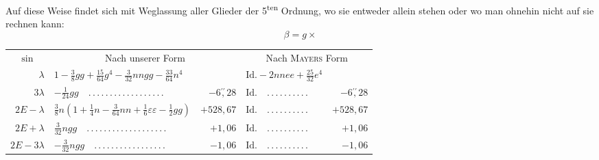 \par\noindent\hspace*{\parindent}Auf diese Weise findet sich mit Weglassung aller Glieder der 5\textsuperscript{ten}
Ordnung, wo sie entweder allein stehen oder wo man ohnehin nicht auf sie
rechnen kann:
\[
\beta=g\times
\]
\begin{landscape}
\begingroup\small
\setlength{\LTpre}{0pt}\setlength{\LTpost}{0pt}
\setlength{\tabcolsep}{3pt}
\renewcommand{\arraystretch}{1.10}
\begin{longtable}{r|p{7.8cm}r@{\quad}p{4.3cm}r}
\multicolumn{1}{c}{\(\sin\)}&\multicolumn{2}{c}{Nach unserer Form}&
\multicolumn{2}{c}{Nach \textsc{Mayers} Form}\\
\(\lambda\)&\(1-\tfrac38gg+\tfrac{15}{64}g^4-\tfrac{3}{32}nngg-\tfrac{33}{64}n^4\)&
&\(\text{Id.}-2nnee+\tfrac{25}{32}e^4\)&\\
\(3\lambda\)&\(-\tfrac{1}{24}gg\quad \mathord{.}\,\mathord{.}\,\mathord{.}\,\mathord{.}\,\mathord{.}\,\mathord{.}\,\mathord{.}\,\mathord{.}\,\mathord{.}\,\mathord{.}\,\mathord{.}\,\mathord{.}\,\mathord{.}\,\mathord{.}\,\mathord{.}\,\mathord{.}\,\mathord{.}\,\mathord{.}\)&\(-6\overset{\prime\prime}{,}28\)
&\(\text{Id.}\quad \mathord{.}\,\mathord{.}\,\mathord{.}\,\mathord{.}\,\mathord{.}\,\mathord{.}\,\mathord{.}\,\mathord{.}\,\mathord{.}\,\mathord{.}\)&\(-6\overset{\prime\prime}{,}28\)\\
\(2E-\lambda\)&\(\tfrac38n(1+\tfrac14n-\tfrac{3}{64}nn+\tfrac16\varepsilon\varepsilon-\tfrac12gg)\)&\(+528{,}67\)
&\(\text{Id.}\quad \mathord{.}\,\mathord{.}\,\mathord{.}\,\mathord{.}\,\mathord{.}\,\mathord{.}\,\mathord{.}\,\mathord{.}\,\mathord{.}\,\mathord{.}\)&\(+528{,}67\)\\
\(2E+\lambda\)&\(\tfrac{3}{32}ngg\quad \mathord{.}\,\mathord{.}\,\mathord{.}\,\mathord{.}\,\mathord{.}\,\mathord{.}\,\mathord{.}\,\mathord{.}\,\mathord{.}\,\mathord{.}\,\mathord{.}\,\mathord{.}\,\mathord{.}\,\mathord{.}\,\mathord{.}\,\mathord{.}\,\mathord{.}\,\mathord{.}\,\mathord{.}\)&\(+1{,}06\)
&\(\text{Id.}\quad \mathord{.}\,\mathord{.}\,\mathord{.}\,\mathord{.}\,\mathord{.}\,\mathord{.}\,\mathord{.}\,\mathord{.}\,\mathord{.}\,\mathord{.}\)&\(+1{,}06\)\\
\(2E-3\lambda\)&\(-\tfrac{3}{32}ngg\quad \mathord{.}\,\mathord{.}\,\mathord{.}\,\mathord{.}\,\mathord{.}\,\mathord{.}\,\mathord{.}\,\mathord{.}\,\mathord{.}\,\mathord{.}\,\mathord{.}\,\mathord{.}\,\mathord{.}\,\mathord{.}\,\mathord{.}\,\mathord{.}\,\mathord{.}\)&\(-1{,}06\)
&\(\text{Id.}\quad \mathord{.}\,\mathord{.}\,\mathord{.}\,\mathord{.}\,\mathord{.}\,\mathord{.}\,\mathord{.}\,\mathord{.}\,\mathord{.}\,\mathord{.}\)&\(-1{,}06\)\\

\end{longtable}
\end{landscape}
